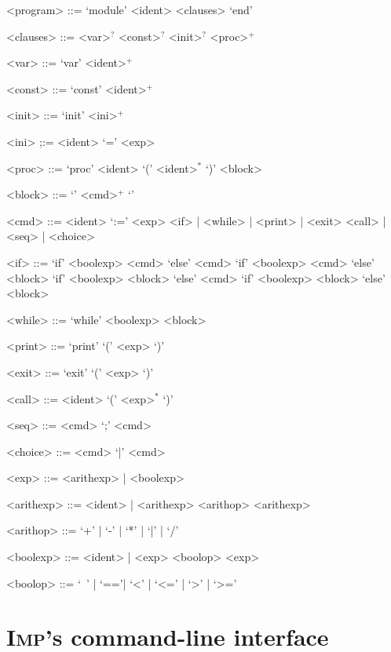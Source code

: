 \documentclass[a4paper,openany]{book}
\begin{document}
\begin{grammar}

<program> ::= `module' <ident> <clauses> `end'

<clauses> ::= <var>$^?$ <const>$^?$ <init>$^?$ <proc>$^+$

<var> ::= `var' <ident>$^+$ 

<const> ::= `const' <ident>$^+$ 

<init> ::= `init' <ini>$^+$

<ini> ;:= <ident> `=' <exp>

<proc> ::= `proc' <ident> `(' <ident>$^*$ `)' <block>

<block> ::= `{' <cmd>$^+$ `}'

<cmd> ::= <ident> `:=' <exp> 
\alt <if> | <while> | <print> | <exit> 
\alt <call> |<seq> | <choice>

<if> ::= `if' <boolexp> <cmd> `else' <cmd> 
\alt `if' <boolexp> <cmd> `else' <block> 
\alt `if' <boolexp> <block> `else' <cmd> 
\alt `if' <boolexp> <block> `else' <block> 

<while> ::= `while' <boolexp> <block>

<print> ::= `print' `(' <exp> `)'

<exit> ::= `exit' `(' <exp> `)'

<call> ::= <ident> `(' <exp>$^*$ `)'

<seq> ::= <cmd> `;' <cmd>

<choice> ::= <cmd> `|' <cmd>

<exp> ::= <arithexp> | <boolexp> 

<arithexp> ::= <ident> | <arithexp> <arithop> <arithexp>

<arithop> ::= `+' | `-' | `*' | `|' | `/'

<boolexp> ::= <ident> | <exp> <boolop> <exp>

<boolop> ::= `~' | `=='| `<' | `<=' | `>' | `>=' 
\end{grammar}

\section{\textsc{Imp}'s command-line interface}
\end{document}
